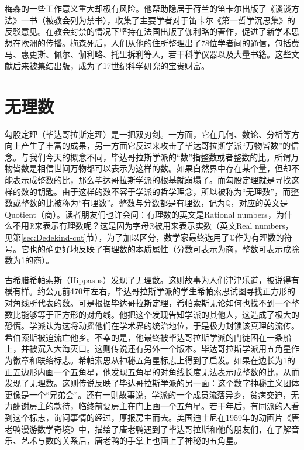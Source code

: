 \documentclass[b5paper]{ctexart}
\begin{document}
\begin{mdframed}
梅森的一些工作意义重大却极有风险。他帮助隐居于荷兰的笛卡尔出版了《谈谈方法》一书（被教会列为禁书），收集了主要学者对于笛卡尔《第一哲学沉思集》的反驳意见。在教会封禁的情况下坚持在法国出版了伽利略的著作，促进了新学术思想在欧洲的传播\cite{Britannia-2024}。梅森死后，人们从他的住所整理出了78位学者间的通信，包括费马、惠更斯、佩尔、伽利略、托里拆利等人，若干科学仪器以及大量书籍。这些文献后来被集结出版，成为了17世纪科学研究的宝贵财富。
\end{mdframed}

\section{无理数} 
勾股定理（毕达哥拉斯定理）是一把双刃剑。一方面，它在几何、数论、分析等方向上产生了丰富的成果，另一方面它反过来攻击了毕达哥拉斯学派“万物皆数”的信念。与我们今天的概念不同，毕达哥拉斯学派的“数”指整数或者整数的比。所谓万物皆数是相信世间万物都可以表示为这样的数。如果自然界中存在某个量，但却不能表示成整数的比，那么毕达哥拉斯学派的根基就崩塌了。而勾股定理就是寻找这样的数的钥匙。由于这样的数不容于学派的哲学理念，所以被称为“无理数”，而整数或整数的比被称为“有理数”。整数与分数都是有理数，记为$\mathbb{Q}$，对应的英文是Quotient（商）。读者朋友们也许会问：有理数的英文是Rational numbers，为什么不用$\mathbb{R}$来表示有理数呢？这是因为字母$\mathbb{R}$被用来表示实数（英文Real numbers，见第\ref{sec:Dedekind-cut}节），为了加以区分，数学家最终选用了$\mathbb{Q}$作为有理数的符号。它也的确更好地反映了有理数的本质属性（分数可表示为商，整数可表示成除数为1的商）。

古希腊希帕索斯（Hippasus）发现了无理数。这则故事为人们津津乐道，被说得有模有样。约公元前470年左右，毕达哥拉斯学派的学生希帕索思试图寻找正方形的对角线所代表的数。可是根据毕达哥拉斯定理，希帕索斯无论如何也找不到一个整数比能够等于正方形的对角线。他把这个发现告知学派的其他人，这造成了极大的恐慌。学派认为这将动摇他们在学术界的统治地位，于是极力封锁该真理的流传。希伯索斯被迫流亡他乡。不幸的是，他最终被毕达哥拉斯学派的门徒困在一条船上，并被沉入大海灭口。这则传说还有另外一个版本。毕达哥拉斯学派用五角星作为徽章和联络标志。希帕索思从神秘五角星标志上得到了启发。如果在边长为1的正五边形内画一个五角星，他发现五角星的对角线长度无法表示成整数的比，从而发现了无理数。这则传说反映了毕达哥拉斯学派的另一面：这个数字神秘主义团体更像是一个“兄弟会”。还有一则故事说，学派的一个成员流落异乡，贫病交迫，无力酬谢房主的款待，临终前要房主在门上画一个五角星。若干年后，有同派的人看到这个标志，询问事情的经过，厚报房主而去\cite{HanXueTao16}。美国迪士尼在1959年的动画片《唐老鸭漫游数学奇境》中，描绘了唐老鸭遇到了毕达哥拉斯和他的朋友们，在了解音乐、艺术与数的关系后，唐老鸭的手掌上也画上了神秘的五角星。
\end{document}
